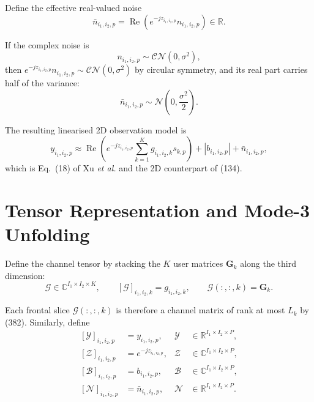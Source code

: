 \documentclass[12pt,a4paper]{article}
\begin{document}
Define the effective real-valued noise
\begin{equation}
\boxed{
\bar n_{i_1,i_2,p}
=
\operatorname{Re}\!\left(
 e^{-jz_{i_1,i_2,p}}
 n_{i_1,i_2,p}
\right)
\in\mathbb R.
}
\tag{389}
\end{equation}

If the complex noise is
\begin{equation}
n_{i_1,i_2,p}\sim\mathcal{CN}(0,\sigma^2),
\tag{390}
\end{equation}
then $e^{-jz_{i_1,i_2,p}}n_{i_1,i_2,p}\sim\mathcal{CN}(0,\sigma^2)$ by
circular symmetry, and its real part carries half of the variance:
\begin{equation}
\boxed{
\bar n_{i_1,i_2,p}
\sim
\mathcal N\!\left(0,\frac{\sigma^2}{2}\right).
}
\tag{391}
\end{equation}

The resulting linearised 2D observation model is
\begin{equation}
\boxed{
 y_{i_1,i_2,p}
 \approx
 \operatorname{Re}\!\left(
 e^{-jz_{i_1,i_2,p}}
 \sum_{k=1}^{K}g_{i_1,i_2,k}s_{k,p}
 \right)
 +|b_{i_1,i_2,p}|
 +\bar n_{i_1,i_2,p},
}
\tag{392}
\end{equation}
which is Eq.~(18) of Xu \emph{et al.} and the 2D counterpart of (134).

\section{Tensor Representation and Mode-3 Unfolding}

Define the channel tensor by stacking the $K$ user matrices
$\mathbf G_k$ along the third dimension:
\begin{equation}
\mathcal G\in\mathbb C^{I_1\times I_2\times K},
\qquad
[\mathcal G]_{i_1,i_2,k}=g_{i_1,i_2,k},
\qquad
\mathcal G(:,:,k)=\mathbf G_k.
\tag{393}
\end{equation}

Each frontal slice $\mathcal G(:,:,k)$ is therefore a channel matrix of
rank at most $L_k$ by (382). Similarly, define
\begin{equation}
\begin{aligned}
[\mathcal Y]_{i_1,i_2,p}&=y_{i_1,i_2,p},
&\mathcal Y&\in\mathbb R^{I_1\times I_2\times P},\\
[\mathcal Z]_{i_1,i_2,p}&=e^{-jz_{i_1,i_2,p}},
&\mathcal Z&\in\mathbb C^{I_1\times I_2\times P},\\
[\mathcal B]_{i_1,i_2,p}&=b_{i_1,i_2,p},
&\mathcal B&\in\mathbb C^{I_1\times I_2\times P},\\
[\mathcal N]_{i_1,i_2,p}&=\bar n_{i_1,i_2,p},
&\mathcal N&\in\mathbb R^{I_1\times I_2\times P}.
\end{aligned}
\tag{394}
\end{equation}
\end{document}
